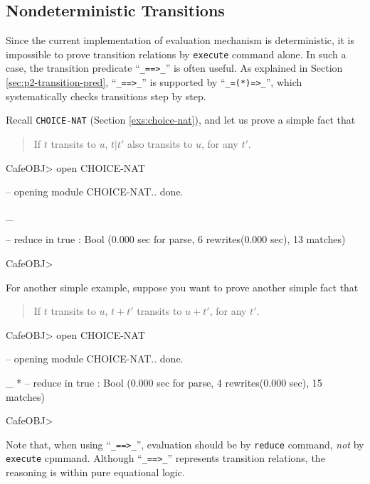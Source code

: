 \documentclass[a4paper]{memoir}
\begin{document}
\subsection{Nondeterministic Transitions}\label{sec:p2-proving-trans}

Since the current implementation of evaluation mechanism is deterministic,
it is impossible to prove transition relations by
\verb|execute| command alone. In such a case, the transition predicate
``\verb|_==>_|'' is often useful.
As explained in Section \ref{sec:p2-transition-pred},
``\verb|_==>_|'' is supported by ``\verb|_=(*)=>_|'', which systematically
checks transitions step by step.

Recall \verb|CHOICE-NAT| (Section \ref{exs:choice-nat}),
and let us prove a simple fact that
\begin{quotation}
  If $t$ transits to $u$, $t|t'$ also transits to
  $u$, for any $t'$.
\end{quotation}
\begin{vvtm}
\begin{ccode}
  CafeOBJ> open CHOICE-NAT

  -- opening module CHOICE-NAT.. done.


  _

  -- reduce in %
  true : Bool
  (0.000 sec for parse, 6 rewrites(0.000 sec), 13 matches)

  CafeOBJ>
\end{ccode}
\end{vvtm}
For another simple example, suppose you want to prove another simple
fact that
\begin{quotation}
  If $t$ transits to $u$, $t + t'$ transits to $u + t'$, for any $t'$.
\end{quotation}
\begin{vvtm}
\begin{ccode}
  CafeOBJ> open CHOICE-NAT

  -- opening module CHOICE-NAT.. done.


  _
  *
  -- reduce in %
  true : Bool
  (0.000 sec for parse, 4 rewrites(0.000 sec), 15 matches)

  CafeOBJ> 
\end{ccode}
\end{vvtm}
Note that, when using ``\verb|_==>_|'',
evaluation should be by \verb|reduce| command, {\em not} by
\verb|execute| cpmmand. Although ``\verb|_==>_|''
represents transition relations, the reasoning is within pure 
equational logic.
\end{document}
